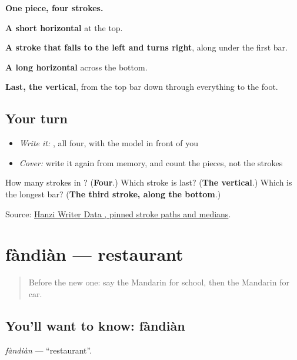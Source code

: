 \begin{quote}
\end{quote}

\textbf{One piece, four strokes.}

\textbf{A short horizontal} at the top.

\textbf{A stroke that falls to the left and turns right}, along under the first bar.

\textbf{A long horizontal} across the bottom.

\textbf{Last, the vertical}, from the top bar down through everything to the foot.

\subsection*{Your turn}
\begin{itemize}
\raggedright
  \item \emph{Write it:} , all four, with the model in front of you
  \item \emph{Cover:} write it again from memory, and count the pieces, not the strokes
\end{itemize}

\begin{tcolorbox}[breakable,colback=teal!4,colframe=teal!35!black,title={Before you move on}]
How many strokes in ? (\textbf{Four}.) Which stroke is last? (\textbf{The vertical}.) Which is the longest bar? (\textbf{The third stroke, along the bottom}.)

Source: \href{https://raw.githubusercontent.com/chanind/hanzi-writer-data/68d10a4b21150cae5e1ebbd223eed289cf32d90c/data/\%E8\%BD\%A6.json}{Hanzi Writer Data , pinned stroke paths and medians}.
\end{tcolorbox}
\section[fàndiàn]{fàndiàn — restaurant}

\label{lesson:ZH-C44-fandian}



\begin{quote}
Before the new one: say the Mandarin for school, then the Mandarin for car.
\end{quote}

\subsection*{You'll want to know: fàndiàn}
\emph{fàndiàn} — \textquotedblleft{}restaurant\textquotedblright{}.

